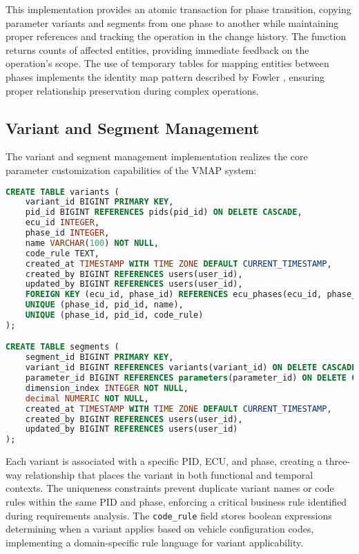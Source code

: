 This implementation provides an atomic transaction for phase transition, copying parameter variants and segments from one phase to another while maintaining proper references and tracking the operation in the change history. The function returns counts of affected entities, providing immediate feedback on the operation's scope. The use of temporary tables for mapping entities between phases implements the identity map pattern described by Fowler \cite{fowler2003patterns}, ensuring proper relationship preservation during complex operations.

\subsection{Variant and Segment Management}
\label{subsec:variant-segment-management}

The variant and segment management implementation realizes the core parameter customization capabilities of the \ac{VMAP} system:

\begin{lstlisting}[language=SQL, caption={Variant and Segment Implementation}, label={lst:variant-segment-tables}]
CREATE TABLE variants (
    variant_id BIGINT PRIMARY KEY,
    pid_id BIGINT REFERENCES pids(pid_id) ON DELETE CASCADE,
    ecu_id INTEGER,
    phase_id INTEGER,
    name VARCHAR(100) NOT NULL,
    code_rule TEXT,
    created_at TIMESTAMP WITH TIME ZONE DEFAULT CURRENT_TIMESTAMP,
    created_by BIGINT REFERENCES users(user_id),
    updated_by BIGINT REFERENCES users(user_id),
    FOREIGN KEY (ecu_id, phase_id) REFERENCES ecu_phases(ecu_id, phase_id),
    UNIQUE (phase_id, pid_id, name),
    UNIQUE (phase_id, pid_id, code_rule)
);

CREATE TABLE segments (
    segment_id BIGINT PRIMARY KEY,
    variant_id BIGINT REFERENCES variants(variant_id) ON DELETE CASCADE,
    parameter_id BIGINT REFERENCES parameters(parameter_id) ON DELETE CASCADE,
    dimension_index INTEGER NOT NULL,
    decimal NUMERIC NOT NULL,
    created_at TIMESTAMP WITH TIME ZONE DEFAULT CURRENT_TIMESTAMP,
    created_by BIGINT REFERENCES users(user_id),
    updated_by BIGINT REFERENCES users(user_id)
);
\end{lstlisting}

Each variant is associated with a specific PID, ECU, and phase, creating a three-way relationship that places the variant in both functional and temporal contexts. The uniqueness constraints prevent duplicate variant names or code rules within the same \ac{PID} and phase, enforcing a critical business rule identified during requirements analysis. The \texttt{code\_rule} field stores boolean expressions determining when a variant applies based on vehicle configuration codes, implementing a domain-specific rule language for variant applicability.

